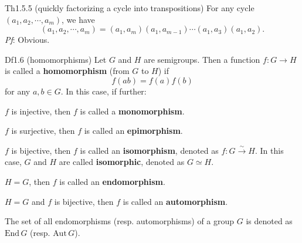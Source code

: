 \documentclass{article}
\newcommand{\Endo}{\text{End}\,}
\newcommand{\Auto}{\text{Aut}\,}
\begin{document}
\begin{Th}{Th1.5.5 (quickly factorizing a cycle into transpositions)}
    For any cycle $(a_1, a_2, \cdots, a_m)$, we have
    $$ (a_1, a_2, \cdots, a_m) = (a_1, a_m)(a_1, a_{m-1})\cdots(a_1, a_3)(a_1, a_2). $$
    \tcblower
    \textit{Pf}: Obvious.
\end{Th}

\begin{Df}{Df1.6 (homomorphisms)}
    Let $G$ and $H$ are semigroups. Then a function $f: G\to H$ is called a \textbf{homomorphism} (from $G$ to $H$) if 
    $$ f(ab) = f(a)f(b) $$
    for any $a, b\in G$. In this case, if further:
    \begin{compactenum}
        \item $f$ is injective, then $f$ is called a \textbf{monomorphism}.
        \item $f$ is surjective, then $f$ is called an \textbf{epimorphism}.
        \item $f$ is bijective, then $f$ is called an \textbf{isomorphism}, denoted as $f: G\overset{\sim}{\to} H$. In this case, $G$ and $H$ are called \textbf{isomorphic}, denoted as $G\simeq H$.
        \item $H = G$, then $f$ is called an \textbf{endomorphism}.
        \item $H = G$ and $f$ is bijective, then $f$ is called an \textbf{automorphism}.
    \end{compactenum}
    The set of all endomorphisms (resp. automorphisms) of a group $G$ is denoted as $\Endo G$ (resp. $\Auto G$).
\end{Df}
\end{document}
